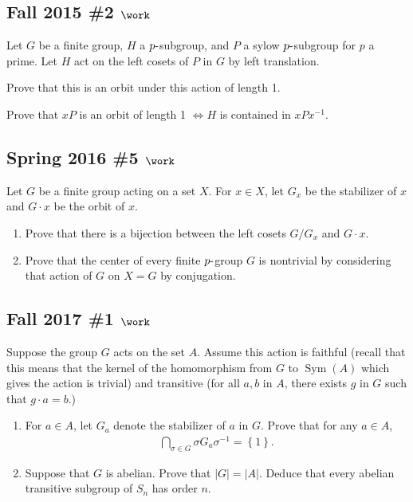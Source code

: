\hypertarget{fall-2015-2-work}{%
\subsection{\texorpdfstring{Fall 2015 \#2
\(\work\)}{Fall 2015 \#2 \textbackslash work}}\label{fall-2015-2-work}}

Let \(G\) be a finite group, \(H\) a \(p{\hbox{-}}\)subgroup, and \(P\)
a sylow \(p{\hbox{-}}\)subgroup for \(p\) a prime. Let \(H\) act on the
left cosets of \(P\) in \(G\) by left translation.

Prove that this is an orbit under this action of length 1.

Prove that \(xP\) is an orbit of length 1 \(\iff H\) is contained in
\(xPx^{-1}\).

\hypertarget{spring-2016-5-work}{%
\subsection{\texorpdfstring{Spring 2016 \#5
\(\work\)}{Spring 2016 \#5 \textbackslash work}}\label{spring-2016-5-work}}

Let \(G\) be a finite group acting on a set \(X\). For \(x\in X\), let
\(G_x\) be the stabilizer of \(x\) and \(G\cdot x\) be the orbit of
\(x\).

\begin{enumerate}
\def\labelenumi{\alph{enumi}.}
\item
  Prove that there is a bijection between the left cosets \(G/G_x\) and
  \(G\cdot x\).
\item
  Prove that the center of every finite \(p{\hbox{-}}\)group \(G\) is
  nontrivial by considering that action of \(G\) on \(X=G\) by
  conjugation.
\end{enumerate}

\hypertarget{fall-2017-1-work}{%
\subsection{\texorpdfstring{Fall 2017 \#1
\(\work\)}{Fall 2017 \#1 \textbackslash work}}\label{fall-2017-1-work}}

Suppose the group \(G\) acts on the set \(A\). Assume this action is
faithful (recall that this means that the kernel of the homomorphism
from \(G\) to \(\operatorname{Sym}(A)\) which gives the action is
trivial) and transitive (for all \(a, b\) in \(A\), there exists \(g\)
in \(G\) such that \(g \cdot a = b\).)

\begin{enumerate}
\def\labelenumi{\alph{enumi}.}
\item
  For \(a \in A\), let \(G_a\) denote the stabilizer of \(a\) in \(G\).
  Prove that for any \(a \in A\),
  \begin{align*}
  \displaystyle\bigcap_{\sigma\in G} \sigma G_a \sigma^{-1}= \left\{{1}\right\}
  .\end{align*}
\item
  Suppose that \(G\) is abelian. Prove that \(|G| = |A|\). Deduce that
  every abelian transitive subgroup of \(S_n\) has order \(n\).
\end{enumerate}

